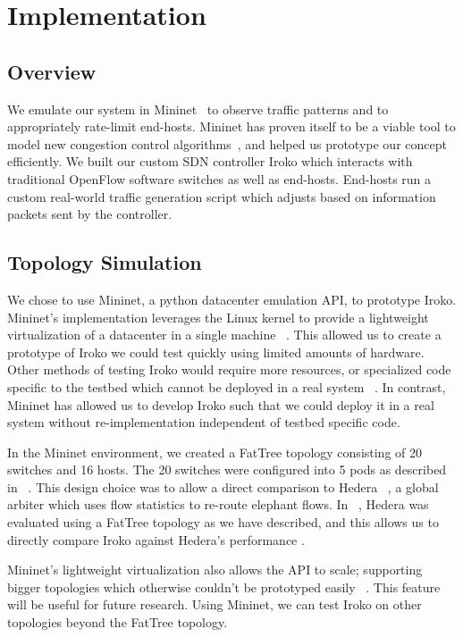 

\section{Implementation}
\subsection{Overview}

We emulate our system in Mininet~\cite{mininet} to observe traffic 
patterns and to appropriately rate-limit end-hosts. Mininet has proven itself to be 
a viable tool to model new congestion control 
algorithms~\cite{mininet_learning}, and helped us prototype our concept 
efficiently. We built our custom SDN controller Iroko which interacts with 
traditional OpenFlow software switches as well as end-hosts. End-hosts run 
a custom real-world traffic generation script which adjusts based on 
information packets sent by the controller.


\subsection{Topology Simulation}
We chose to use  Mininet, a python datacenter emulation API, to prototype Iroko.
Mininet's implementation leverages the Linux kernel to provide a lightweight virtualization
of a datacenter in a single machine ~\cite{mininet}. This allowed us to create a prototype of
Iroko we could test quickly using limited amounts of hardware. Other methods of testing Iroko 
would require more resources, or specialized code specific to the testbed which cannot be 
deployed in a real system ~\cite{mininet}. In contrast, Mininet has allowed us to develop
Iroko such that we could deploy it in a real system without re-implementation independent of testbed specific code. 

In the Mininet environment, we created a FatTree topology consisting of 20 switches and 16 hosts.
The 20 switches were configured into 5 pods as described in ~\cite{fattree}. This design choice was
to allow a direct comparison to Hedera  ~\cite{hedera}, a global arbiter which uses flow statistics
to re-route elephant flows. In ~\cite{hedera}, Hedera was evaluated using a FatTree topology as
we have described, and this allows us to directly compare Iroko against Hedera's performance . 

Mininet's lightweight virtualization also allows the API to scale; supporting bigger topologies which otherwise couldn't be prototyped easily ~\cite{mininet}.
This feature will be useful for future research. Using Mininet, we can test Iroko on other topologies beyond the FatTree topology. 

